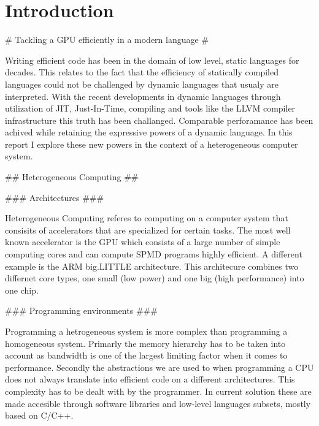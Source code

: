 
\chapter{Introduction}





\begin{markdown}
# Tackling a GPU efficiently in a modern language #

Writing efficient code has been in the domain of low level, static
languages for decades. This relates to the fact that the efficiency of
statically compiled languages could not be challenged by dynamic
languages that usualy are interpreted. 
With the recent developments in dynamic
languages through utilization of JIT, Just-In-Time, compiling and
tools like the LLVM compiler infrastructure this truth has been
challanged. Comparable perforamance has been achived while retaining
the expressive powers of a dynamic language. In this report I explore
these new powers in the context of a heterogeneous computer system.

## Heterogeneous Computing ##

### Architectures ###

Heterogeneous Computing referes to computing on a computer system that
consisits of accelerators that are specialized for certain tasks. The
most well known accelerator is the GPU which consists of a large
number of simple computing cores and can compute SPMD programs highly
efficient. A different example is the ARM big.LITTLE
architecture. This architecure combines two differnet core types, one
small (low power) and one big (high performance) into one chip.

### Programming environments ###

Programming a hetrogeneous system is more complex than programming a
homogeneous system. Primarly the memory hierarchy has to be taken into
account as bandwidth is one of the largest limiting factor when it
comes to performance. Secondly the abstractions we are used to when
programming a CPU does not always translate into efficient code on a
different architectures. This complexity has to be dealt with by the
programmer. In current solution these are made accesible through
software libraries and low-level languages subsets, mostly based on
C/C++.







\end{markdown}
